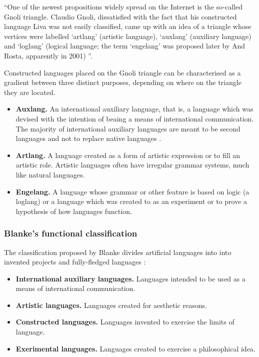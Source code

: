 \documentclass[14pt, a4paper]{extreport}
\begin{document}
``One of the newest propositions widely spread on the Internet is the so-called Gnoli triangle. Claudio Gnoli, dissatisfied with the fact that his constructed language Liva was not easily classified, came up with an idea of a triangle whose vertices were labelled ‘artlang’ (artistic language), ‘auxlang’ (auxiliary language) and ‘loglang’ (logical language; the term ‘engelang’ was proposed later by And Rosta, apparently in 2001) \parencite[97]{stria}''.

Constructed languages placed on the Gnoli triangle can be characterised as a gradient between three distinct purposes, depending on where on the triangle they are located.

\begin{itemize}
  \item \textbf{Auxlang.} An international auxiliary language, that is, a language which was devised with the intention of beaing a means of international communication. The majority of international auxiliary languages are meant to be second languages and not to replace native languages \parencite{reed}.
  \item \textbf{Artlang.} A language created as a form of artistic expression or to fill an artistic role. Artistic languages often have irregular grammar systems, much like natural languages.
  \item \textbf{Engelang.} A language whose grammar or other feature is based on logic (a loglang) or a language which was created to as an experiment or to prove a hypothesis of how languages function.
\end{itemize}
      \subsubsection{Blanke's functional classification}
The classification proposed by Blanke divides artificial languages into into invented projects and fully-fledged languages \parencite{stria}:

\begin{itemize}
  \item \textbf{International auxiliary languages.} Languages intended to be used as a means of international communication.
  \item \textbf{Artistic languages.} Languages created for aesthetic reasons.
  \item \textbf{Constructed languages.} Languages invented to exercise the limits of language.
  \item \textbf{Exerimental languages.} Languages created to exercise a philosophical idea.
\end{itemize}
        \bigskip
\end{document}
